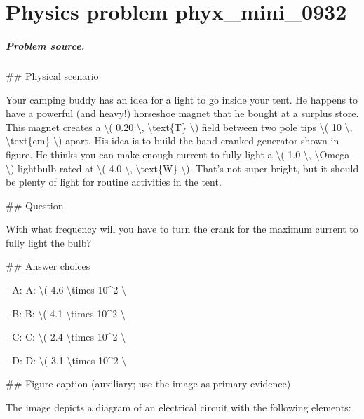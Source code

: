 
\chapter{Physics problem phyx\_mini\_0932}
\label{ch:PhyXMiniProblems_problem_phyx_mini_0932}

\paragraph{Problem source.}
\#\# Physical scenario

Your camping buddy has an idea for a light to go inside your tent. He happens to have a powerful (and heavy!) horseshoe magnet that he bought at a surplus store. This magnet creates a \textbackslash{}( 0.20 \textbackslash{}, \textbackslash{}text\{T\} \textbackslash{}) field between two pole tips \textbackslash{}( 10 \textbackslash{}, \textbackslash{}text\{cm\} \textbackslash{}) apart. His idea is to build the hand-cranked generator shown in figure. He thinks you can make enough current to fully light a \textbackslash{}( 1.0 \textbackslash{}, \textbackslash{}Omega \textbackslash{}) lightbulb rated at \textbackslash{}( 4.0 \textbackslash{}, \textbackslash{}text\{W\} \textbackslash{}). That's not super bright, but it should be plenty of light for routine activities in the tent.

\#\# Question

With what frequency will you have to turn the crank for the maximum current to fully light the bulb?

\#\# Answer choices

- A: A: \textbackslash{}( 4.6 \textbackslash{}times 10\textasciicircum{}2 \textbackslash{}

- B: B: \textbackslash{}( 4.1 \textbackslash{}times 10\textasciicircum{}2 \textbackslash{}

- C: C: \textbackslash{}( 2.4 \textbackslash{}times 10\textasciicircum{}2 \textbackslash{}

- D: D: \textbackslash{}( 3.1 \textbackslash{}times 10\textasciicircum{}2 \textbackslash{}

\#\# Figure caption (auxiliary; use the image as primary evidence)

The image depicts a diagram of an electrical circuit with the following elements:

